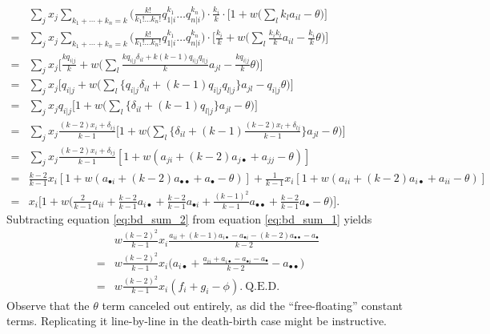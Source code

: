 \documentclass[14pt, a4paper, justified]{article}
\begin{document}
\begin{equation}
    \begin{split}
        & \sum_j x_j \sum_{k_1 + \cdots + k_n = k} \Big( \frac{k!}{k_1! \ldots k_n!} q_{1|i}^{k_1} \ldots q_{n|i}^{k_n} \Big) \cdot \frac{k_i}{k} \cdot \Big[ 1 + w \Big( \sum_l k_l a_{il} - \theta \Big) \Big]
        \\
        = & \sum_j x_j \sum_{k_1 + \cdots + k_n = k} \Big( \frac{k!}{k_1! \ldots k_n!} q_{1|i}^{k_1} \ldots q_{n|i}^{k_n} \Big) \cdot \Big[ \frac{k_i}{k} + w \Big( \sum_l \frac{k_i k_l}{k} a_{il} - \frac{k_i}{k}\theta \Big) \Big]
        \\
        = & \sum_j x_j \Big[ \frac{kq_{i|j}}{k} + w \Big( \sum_l \frac{k q_{i|j} \delta_{il} + k(k-1) q_{i|j} q_{l|j}}{k}a_{jl} - \frac{kq_{i|j}}{k}\theta \Big) \Big]
        \\
        = & \sum_j x_j \Big[ q_{i|j} + w \Big( \sum_l \{ q_{i|j} \delta_{il} + (k-1) q_{i|j} q_{l|j} \} a_{jl} - q_{i|j} \theta \Big) \Big]
        \\
        = & \sum_j x_j q_{i|j} \Big[ 1 + w \Big( \sum_l \{ \delta_{il} + (k-1) q_{l|j} \} a_{jl} - \theta \Big) \Big]
        \\
        = & \sum_j x_j \frac{(k-2)x_i + \delta_{ij}}{k-1} \Big[ 1 + w \Big( \sum_l \Big\{ \delta_{il} + (k-1) \frac{(k-2)x_l +\delta_{lj}}{k-1} \Big\} a_{jl} - \theta \Big) \Big]
        \\
        = & \sum_j x_j \frac{(k-2)x_i + \delta_{ij}}{k-1} [ 1 + w(a_{ji} + (k-2) a_{j \bullet} + a_{jj} - \theta )]
        \\
        = & \frac{k-2}{k-1} x_i [ 1 + w(a_{\bullet i} + (k-2) a_{\bullet \bullet} + a_{\bullet} - \theta )]
        + \frac{1}{k-1} x_i [ 1 + w(a_{ii} + (k-2) a_{i \bullet} + a_{ii} - \theta )]
        \\
        = & x_i \Big[ 1 + w \Big( \frac{2}{k-1} a_{ii} + \frac{k-2}{k-1} a_{i \bullet} + \frac{k-2}{k-1} a_{\bullet i} + \frac{(k-1)^2}{k-1} a_{\bullet \bullet} + \frac{k-2}{k-1} a_{\bullet} - \theta \Big) \Big].
    \end{split}
    \label{eq:bd_sum_2}
\end{equation}
Subtracting equation \ref{eq:bd_sum_2} from equation \ref{eq:bd_sum_1} yields
\begin{equation}
    \begin{split}
        & w \frac{(k-2)^2}{k-1} x_i \frac{a_{ii} + (k-1) a_{i \bullet} - a_{\bullet i} - (k-2) a_{\bullet \bullet} - a_{\bullet}}{k-2}
        \\
        = & w \frac{(k-2)^2}{k-1} x_i \Big( a_{i \bullet} + \frac{a_{ii} + a_{i \bullet} - a_{\bullet i} - a_{\bullet}}{k-2} - a_{\bullet \bullet} \Big)
        \\
        = & w \frac{(k-2)^2}{k-1} x_i (f_i + g_i - \phi). \mathrm{~Q.E.D.}
    \end{split}
\end{equation}
Observe that the $\theta$ term canceled out entirely, as did the ``free-floating'' constant terms.
Replicating it line-by-line in the death-birth case might be instructive.
\end{document}
